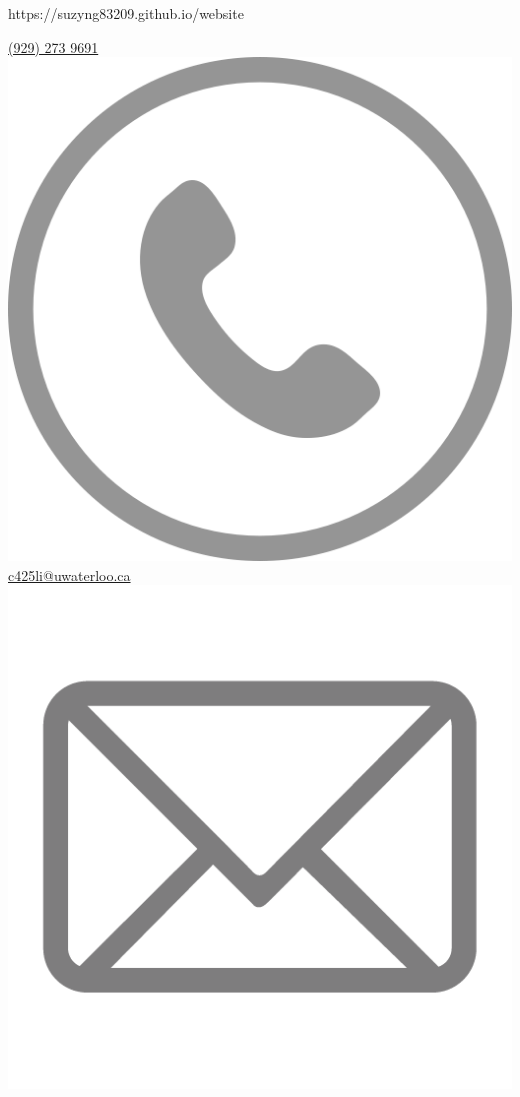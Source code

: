 \documentclass[]{friggeri-cv}
\begin{document}
       {https://suzyng83209.github.io/website}


\begin{aside}
  \href{tel:19292739691}{(929) 273 9691 \includegraphics[scale=0.02]{phone-512.png}}
  \href{mailto:c425li@edu.uwaterloo.ca}{c425li@uwaterloo.ca\includegraphics[scale=0.04]{email-icon.png}}

\end{aside}
\end{document}
